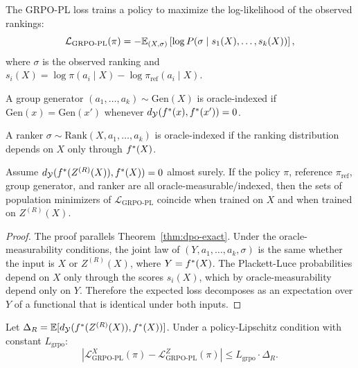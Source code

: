 The GRPO-PL loss trains a policy to maximize the log-likelihood of the observed rankings:
\[
\mathcal{L}_{\text{GRPO-PL}}(\pi) = -\mathbb{E}_{(X, \sigma)} \left[ \log P(\sigma \mid s_1(X), \ldots, s_k(X)) \right],
\]
where $\sigma$ is the observed ranking and $s_i(X) = \log \pi(a_i \mid X) - \log \pi_{\text{ref}}(a_i \mid X)$.

\begin{definition}
A group generator $(a_1, \ldots, a_k) \sim \text{Gen}(X)$ is oracle-indexed if $\text{Gen}(x) = \text{Gen}(x')$ whenever $d_{\mathcal{Y}}(f^{\ast}(x), f^{\ast}(x')) = 0$.
\end{definition}

\begin{definition}
A ranker $\sigma \sim \text{Rank}(X, a_1, \ldots, a_k)$ is oracle-indexed if the ranking distribution depends on $X$ only through $f^{\ast}(X)$.
\end{definition}

\begin{theorem}\label{thm:grpo-pl-exact}
Assume $d_{\mathcal{Y}}(f^{\ast}(Z^{(R)}(X)), f^{\ast}(X)) = 0$ almost surely. If the policy $\pi$, reference $\pi_{\text{ref}}$, group generator, and ranker are all oracle-measurable/indexed, then the sets of population minimizers of $\mathcal{L}_{\text{GRPO-PL}}$ coincide when trained on $X$ and when trained on $Z^{(R)}(X)$.
\end{theorem}

\begin{proof}
The proof parallels Theorem~\ref{thm:dpo-exact}. Under the oracle-measurability conditions, the joint law of $(Y, a_1, \ldots, a_k, \sigma)$ is the same whether the input is $X$ or $Z^{(R)}(X)$, where $Y = f^{\ast}(X)$. The Plackett-Luce probabilities depend on $X$ only through the scores $s_i(X)$, which by oracle-measurability depend only on $Y$. Therefore the expected loss decomposes as an expectation over $Y$ of a functional that is identical under both inputs.
\end{proof}

\begin{theorem}\label{thm:grpo-pl-gap}
Let $\Delta_R = \mathbb{E}[d_{\mathcal{Y}}(f^{\ast}(Z^{(R)}(X)), f^{\ast}(X))]$. Under a policy-Lipschitz condition with constant $L_{\text{grpo}}$:
\[
|\mathcal{L}_{\text{GRPO-PL}}^X(\pi) - \mathcal{L}_{\text{GRPO-PL}}^Z(\pi)| \le L_{\text{grpo}} \cdot \Delta_R.
\]
\end{theorem}


